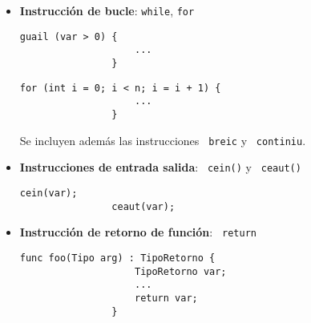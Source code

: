 \documentclass[10pt,a4paper]{article}
\begin{document}
\begin{itemize}
    \item \textbf{Instrucción de bucle}: \texttt{while}, \texttt{for}
    \begin{center}
        \begin{minipage}{\linewidth}
            \begin{lstlisting}[linewidth=0.3\linewidth, gobble=16]
                guail (var > 0) {
                    ...
                }
            \end{lstlisting}
        \end{minipage}
    \end{center}
    \begin{center}
        \begin{minipage}{\linewidth}
            \begin{lstlisting}[linewidth=0.5\linewidth, gobble=16]
                for (int i = 0; i < n; i = i + 1) {
                    ...
                }
            \end{lstlisting}
        \end{minipage}
    \end{center}
    Se incluyen además las instrucciones \texttt{\color{blue} breic} y \texttt{\color{blue} continiu}.

    \item \textbf{Instrucciones de entrada salida}: \texttt{\color{blue} cein()} y \texttt{\color{blue} ceaut()}
    \begin{center}
        \begin{minipage}{\linewidth}
            \begin{lstlisting}[linewidth=0.3\linewidth, gobble=16]
                cein(var);
                ceaut(var);
            \end{lstlisting}
        \end{minipage}
    \end{center}
    
    \item \textbf{Instrucción de retorno de función}: \texttt{\color{blue} return}
    \begin{center}
        \begin{minipage}{\linewidth}
            \begin{lstlisting}[linewidth=0.5\linewidth, gobble=16]
                func foo(Tipo arg) : TipoRetorno {
                    TipoRetorno var;
                    ...
                    return var;
                }
            \end{lstlisting}
        \end{minipage}
    \end{center}

\end{itemize}
\end{document}
